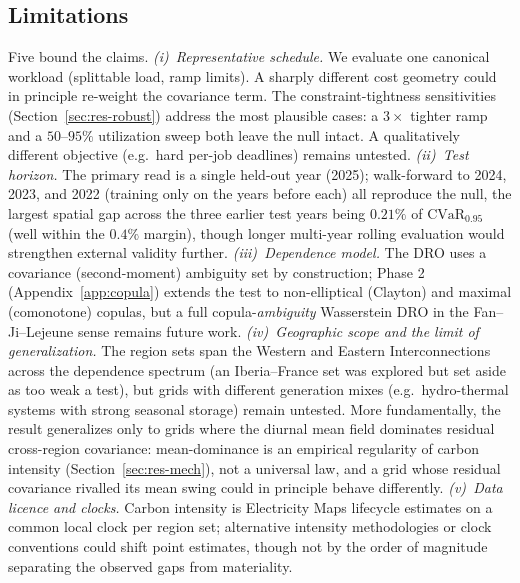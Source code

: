\documentclass[12pt]{article}
\newcommand{\CVaR}{\mathrm{CVaR}}
\begin{document}
\subsection{Limitations}
Five bound the claims. \emph{(i)~Representative schedule.} We evaluate one
canonical workload (splittable load, ramp limits). A sharply different cost geometry
could in principle re-weight the covariance term. The constraint-tightness
sensitivities (Section~\ref{sec:res-robust}) address the most plausible cases: a
$3\times$ tighter ramp and a $50$--$95\%$ utilization sweep both leave the null
intact. A qualitatively different objective (e.g.\ hard per-job deadlines) remains
untested.
\emph{(ii)~Test horizon.} The primary read is a single held-out year (2025);
walk-forward to 2024, 2023, and 2022 (training only on the years before each) all
reproduce the null, the largest spatial gap across the three earlier test years being
$0.21\%$ of $\CVaR_{0.95}$ (well within the $0.4\%$ margin), though longer multi-year
rolling evaluation would strengthen external validity further. \emph{(iii)~Dependence model.} The DRO uses a
covariance (second-moment) ambiguity set by construction; Phase 2
(Appendix~\ref{app:copula}) extends the test to non-elliptical (Clayton) and maximal
(comonotone) copulas, but a full copula-\emph{ambiguity} Wasserstein DRO in the
Fan--Ji--Lejeune sense remains future work. \emph{(iv)~Geographic scope and the limit of generalization.} The region sets span
the Western and Eastern Interconnections across the dependence spectrum (an Iberia--France
set was explored but set aside as too weak a test), but grids with different generation
mixes (e.g.\ hydro-thermal systems with strong seasonal storage) remain untested. More fundamentally, the result
generalizes only to grids where the diurnal mean field dominates residual
cross-region covariance: mean-dominance is an empirical regularity of carbon
intensity (Section~\ref{sec:res-mech}), not a universal law, and a grid whose
residual covariance rivalled its mean swing could in principle behave differently. \emph{(v)~Data licence and clocks.} Carbon
intensity is Electricity Maps lifecycle estimates on a common local clock per
region set; alternative intensity methodologies or clock conventions could shift
point estimates, though not by the order of magnitude separating the observed gaps
from materiality.

\end{document}
